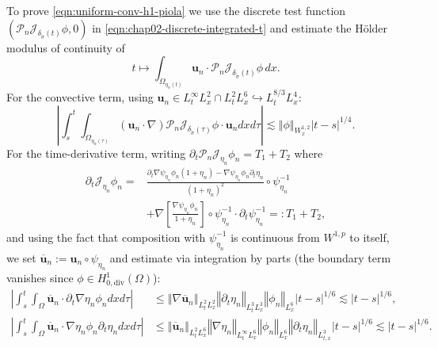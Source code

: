 \documentclass[10pt,a4paper]{article}
\numberwithin{equation}{section}
\begin{document}
To prove \eqref{eqn:uniform-conv-h1-piola} we use the discrete test function $\left(\mathcal{P}_{n}\mathcal{J}_{\delta_{\tilde\sigma}\left(t\right)}\phi,0\right)$ in \eqref{eqn:chap02-discrete-integrated-t} and estimate the H\"{o}lder modulus of continuity of
\[
t\mapsto\int_{\Omega_{\eta_{n}\left(t\right)}}\mathbf{u}_{n}\cdot\mathcal{P}_{n}\mathcal{J}_{\delta_{\tilde\sigma}\left(t\right)}\phi\, dx.
\]
For the convective term, using $\mathbf{u}_{n}\in L_{t}^{\infty}L_{x}^{2}\cap L_{t}^{2}L_{x}^{6}\hookrightarrow L_{t}^{8/3}L_{x}^{4}$:
\begin{equation}
\left|\int_{s}^{t}\int_{\Omega_{\eta_{n}\left(\tau\right)}}\left(\mathbf{u}_{n}\cdot\nabla\right)\mathcal{P}_{n}\mathcal{J}_{\delta_{\tilde\sigma}\left(\tau\right)}\phi\cdot\mathbf{u}_{n}dxd\tau\right|\lesssim\left\Vert \phi\right\Vert _{W_{x}^{1,2}}\left|t-s\right|^{1/4}.
\end{equation}
For the time-derivative term, writing $\partial_{t}\mathcal{P}_{n}\mathcal{J}_{\eta_{n}}\phi_{n}=T_{1}+T_{2}$ where
\begin{equation}
\begin{aligned}\partial_{t}\mathcal{J}_{\eta_{n}}\phi_{n}= & \frac{\partial_{t}\nabla\psi_{\eta_{n}}\phi_{n}\left(1+\eta_{n}\right)-\nabla\psi_{\eta_{n}}\phi_{n}\partial_{t}\eta_{n}}{\left(1+\eta_{n}\right)^{2}}\circ\psi_{\eta_{n}}^{-1}\\
 & +\nabla\left[\frac{\nabla\psi_{\eta_{n}}\phi_{n}}{1+\eta_{n}}\right]\circ\psi_{\eta_{n}}^{-1}\cdot\partial_{t}\psi_{\eta_{n}}^{-1}=:T_{1}+T_{2},
\end{aligned}
\end{equation}
and using the fact that composition with $\psi_{\eta_{n}}^{-1}$ is continuous from $W^{1,p}$ to itself, we set $\overline{\mathbf{u}}_{n}:=\mathbf{u}_{n}\circ\psi_{\eta_n}$ and estimate via integration by parts (the boundary term vanishes since $\phi\in H_{0,\text{div}}^{1}\left(\Omega\right)$):
\begin{equation}
\begin{aligned}\left|\int_{s}^{t}\int_{\Omega}\overline{\mathbf{u}}_{n}\cdot\partial_{t}\nabla\eta_{n}\phi_{n}dxd\tau\right| & \le\left\Vert \nabla\overline{\mathbf{u}}_{n}\right\Vert _{L_{t}^{2}L_{x}^{2}}\left\Vert \partial_{t}\eta_{n}\right\Vert _{L_{t}^{3}L_{x}^{3}}\left\Vert \phi_{n}\right\Vert _{L_{x}^{6}}\left|t-s\right|^{1/6}\lesssim\left|t-s\right|^{1/6},\\
\left|\int_{s}^{t}\int_{\Omega}\overline{\mathbf{u}}_{n}\cdot\nabla\eta_{n}\phi_{n}\partial_{t}\eta_{n}dxd\tau\right| & \le\left\Vert \overline{\mathbf{u}}_{n}\right\Vert _{L_{t}^{2}L_{x}^{6}}\left\Vert \nabla\eta_{n}\right\Vert _{L_{t}^{\infty}L_{x}^{6}}\left\Vert \phi_{n}\right\Vert _{L_{x}^{6}}\left\Vert \partial_{t}\eta_{n}\right\Vert _{L_{t,x}^{3}}\left|t-s\right|^{1/6}\lesssim\left|t-s\right|^{1/6}.
\end{aligned}
\end{equation}
\end{document}
